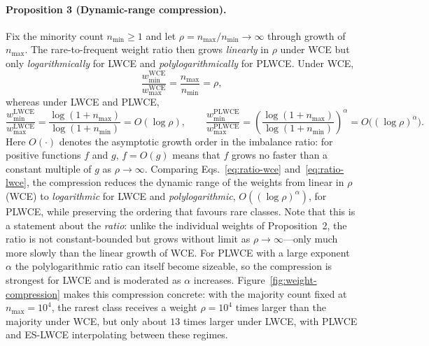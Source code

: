 \documentclass[a4paper,fleqn]{cas-sc}
\begin{document}
\paragraph{Proposition 3 (Dynamic-range compression).}
Fix the minority count $n_{\min} \ge 1$ and let $\rho = n_{\max}/n_{\min} \to \infty$
through growth of $n_{\max}$. The rare-to-frequent weight ratio then grows
\emph{linearly} in $\rho$ under WCE but only \emph{logarithmically} for LWCE and
\emph{polylogarithmically} for PLWCE. Under WCE,
\begin{equation}\label{eq:ratio-wce}
\frac{w_{\min}^{\mathrm{WCE}}}{w_{\max}^{\mathrm{WCE}}}
   = \frac{n_{\max}}{n_{\min}} = \rho,
\end{equation}
whereas under LWCE and PLWCE,
\begin{equation}\label{eq:ratio-lwce}
\frac{w_{\min}^{\mathrm{LWCE}}}{w_{\max}^{\mathrm{LWCE}}}
   = \frac{\log(1+n_{\max})}{\log(1+n_{\min})} = O(\log \rho),
\qquad
\frac{w_{\min}^{\mathrm{PLWCE}}}{w_{\max}^{\mathrm{PLWCE}}}
   = \left(\frac{\log(1+n_{\max})}{\log(1+n_{\min})}\right)^{\!\alpha}
   = O\big((\log \rho)^{\alpha}\big).
\end{equation}
Here $O(\cdot)$ denotes the asymptotic growth order in the imbalance ratio: for
positive functions $f$ and $g$, $f = O(g)$ means that $f$ grows no faster than a
constant multiple of $g$ as $\rho \to \infty$. Comparing
Eqs.~\eqref{eq:ratio-wce} and~\eqref{eq:ratio-lwce}, the compression reduces the
dynamic range of the weights from linear in $\rho$ (WCE) to \emph{logarithmic} for
LWCE and \emph{polylogarithmic}, $O((\log\rho)^{\alpha})$, for PLWCE, while
preserving the ordering that favours rare classes. Note that this is a statement
about the \emph{ratio}: unlike the individual weights of Proposition~2, the ratio
is not constant-bounded but grows without limit as $\rho \to \infty$---only much
more slowly than the linear growth of WCE. For PLWCE with a large exponent
$\alpha$ the polylogarithmic ratio can itself become sizeable, so the compression
is strongest for LWCE and is moderated as $\alpha$ increases.
Figure~\ref{fig:weight-compression} makes this compression concrete: with the
majority count fixed at $n_{\max}=10^4$, the rarest class receives a weight
$\rho = 10^4$ times larger than the majority under WCE, but only about $13$ times
larger under LWCE, with PLWCE and ES-LWCE interpolating between these regimes.
\end{document}
